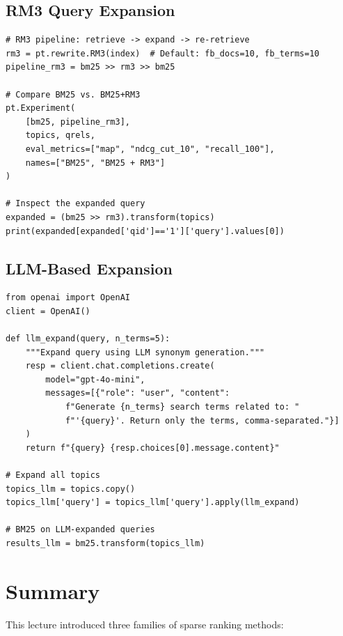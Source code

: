 \documentclass[11pt,a4paper]{article}
\theoremstyle{definition}
\theoremstyle{plain}
\begin{document}
\subsection{RM3 Query Expansion}

\begin{lstlisting}
# RM3 pipeline: retrieve -> expand -> re-retrieve
rm3 = pt.rewrite.RM3(index)  # Default: fb_docs=10, fb_terms=10
pipeline_rm3 = bm25 >> rm3 >> bm25

# Compare BM25 vs. BM25+RM3
pt.Experiment(
    [bm25, pipeline_rm3],
    topics, qrels,
    eval_metrics=["map", "ndcg_cut_10", "recall_100"],
    names=["BM25", "BM25 + RM3"]
)

# Inspect the expanded query
expanded = (bm25 >> rm3).transform(topics)
print(expanded[expanded['qid']=='1']['query'].values[0])
\end{lstlisting}

\subsection{LLM-Based Expansion}

\begin{lstlisting}
from openai import OpenAI
client = OpenAI()

def llm_expand(query, n_terms=5):
    """Expand query using LLM synonym generation."""
    resp = client.chat.completions.create(
        model="gpt-4o-mini",
        messages=[{"role": "user", "content":
            f"Generate {n_terms} search terms related to: "
            f"'{query}'. Return only the terms, comma-separated."}]
    )
    return f"{query} {resp.choices[0].message.content}"

# Expand all topics
topics_llm = topics.copy()
topics_llm['query'] = topics_llm['query'].apply(llm_expand)

# BM25 on LLM-expanded queries
results_llm = bm25.transform(topics_llm)
\end{lstlisting}


\section{Summary}
\label{sec:summary}

This lecture introduced three families of sparse ranking methods:
\end{document}
